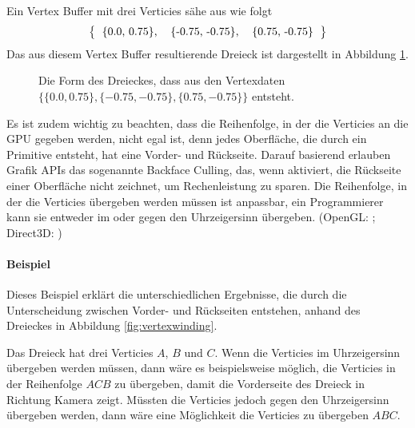 Ein Vertex Buffer mit drei Verticies sähe aus wie folgt
$$
\left\{
\begin{tabular}{ccc}
    \{0.0, 0.75\}, & \{-0.75, -0.75\}, & \{0.75, -0.75\}
\end{tabular}
\right\}
$$
Das aus diesem Vertex Buffer resultierende Dreieck ist dargestellt in Abbildung \ref{fig:vertexbuftri}.

\begin{figure}
    \caption{Die Form des Dreieckes, dass aus den Vertexdaten $\{\{0.0, 0.75\}, \{-0.75, -0.75\}, \{0.75, -0.75\}\}$ entsteht.}
    \label{fig:vertexbuftri}
    \begin{center}
    \end{center}
\end{figure}

Es ist zudem wichtig zu beachten, dass die Reihenfolge, in der die Verticies an die GPU gegeben werden, nicht egal ist, denn jedes Oberfläche, die durch ein Primitive entsteht, hat eine Vorder- und Rückseite. Darauf basierend erlauben Grafik APIs das sogenannte Backface Culling, das, wenn aktiviert, die Rückseite einer Oberfläche nicht zeichnet, um Rechenleistung zu sparen. Die Reihenfolge, in der die Verticies übergeben werden müssen ist anpassbar, ein Programmierer kann sie entweder im oder gegen den Uhrzeigersinn übergeben. (OpenGL: \cite{gl_vertexwinding}; Direct3D: \cite{d3d_vertexwinding})

\paragraph{Beispiel}
Dieses Beispiel erklärt die unterschiedlichen Ergebnisse, die durch die Unterscheidung zwischen Vorder- und Rückseiten entstehen, anhand des Dreieckes in Abbildung \ref{fig:vertexwinding}. 

Das Dreieck hat drei Verticies $A$, $B$ und $C$. Wenn die Verticies im Uhrzeigersinn übergeben werden müssen, dann wäre es beispielsweise möglich, die Verticies in der Reihenfolge $A C B$ zu übergeben, damit die Vorderseite des Dreieck in Richtung Kamera zeigt. Müssten die Verticies jedoch gegen den Uhrzeigersinn übergeben werden, dann wäre eine Möglichkeit die Verticies zu übergeben $A B C$.

